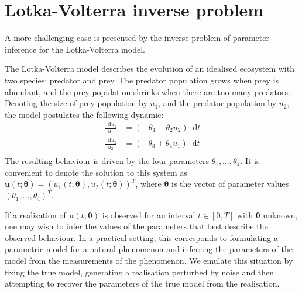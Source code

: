 \documentclass[11pt,a4paper]{report}
\newcommand*\diff{\mathop{}\!\mathrm{d}}
\begin{document}
\section{Lotka-Volterra inverse problem}
\label{sec:lotka-volterra}

A more challenging case is presented by the inverse problem of parameter inference for the Lotka-Volterra model.


The Lotka-Volterra model describes the evolution of an idealised ecosystem with two species: predator and prey. The predator population grows when prey is abundant, and the prey population shrinks when there are too many predators. Denoting the size of prey population by $u_1$, and the predator population by $u_2$, the model postulates the following dynamic:
\begin{equation}
\begin{aligned}
\frac{\diff u_1}{u_1} & = ( \;\;\;\theta_1 - \theta_2 u_2 ) \diff t \\
\frac{\diff u_2}{u_2} & = ( -\theta_3 + \theta_4 u_1 ) \diff t \\
\end{aligned}
\label{eq:lotka-volterra}
\end{equation}
The resulting behaviour is driven by the four parameters $\theta_1, \dots, \theta_4$. It is convenient to denote the solution to this system as  $\mathbf{u}(t;\pmb{\theta}) = (u_1(t; \pmb{\theta}), u_2(t; \pmb{\theta}))^T$, where $\pmb{\theta}$ is the vector of parameter values $(\theta_1, \dots, \theta_4)^T$.

If a realisation of $\mathbf{u}(t; \pmb{\theta})$ is observed for an interval $t \in [0, T]$ with $\pmb{\theta}$ unknown, one may wish to infer the values of the parameters that best describe the observed behaviour. In a practical setting, this corresponds to formulating a parametric model for a natural phenomenon and inferring the parameters of the model from the measurements of the phenomenon. We emulate this situation by fixing the true model, generating a realisation perturbed by noise and then attempting to recover the parameters of the true model from the realisation.
\end{document}
